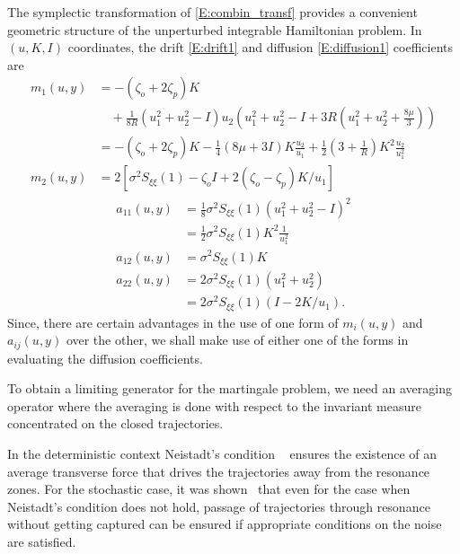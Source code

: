 The symplectic transformation of \eqref{E:combin_transf} provides a convenient geometric structure of the unperturbed integrable Hamiltonian problem. In $(u,K,I)$ coordinates, the drift \eqref{E:drift1} and diffusion \eqref{E:diffusion1} coefficients are
\begin{equation}
\begin{aligned}
m_1(u,y) &= -(\zeta_o + 2\zeta_p) K\\
&\quad + \frac{1}{8 R} \left(u_1^2+u_2^2-I \right) u_2 \left(u_1^2+u_2^2-I + 3 R \left( u_1^2+u_2^2 + \frac{8 \mu}{3} \right) \right) \\
&= -(\zeta_o + 2\zeta_p) K - \frac14 \left(8\mu + 3I\right) K \frac{u_2}{u_1} + \frac12\left(3 + \frac{1}{R}\right)K^2 \frac{u_2}{u_1^2}\\
m_2(u,y) &= 2[\sigma^2 S_{\xi\xi}(1) - \zeta_o I + 2 (\zeta_o - \zeta_p) K/u_1]
\end{aligned}
\label{E:drift2}
\end{equation}
\begin{equation}
\begin{aligned}
a_{11}(u,y) &=\frac{1}{8} \sigma^2 S_{\xi\xi}(1) \left(u_1^2 + u_2^2 - I \right)^2\\
&= \frac12 \sigma^2 S_{\xi\xi}(1) K^2 \frac{1}{u_1^2}\\
a_{12}(u,y) &= \sigma^2 S_{\xi\xi}(1) K\\
a_{22}(u,y) &= 2 \sigma^2S_{\xi\xi}(1) (u_1^2 + u_2^2)\\
&= 2 \sigma^2 S_{\xi\xi}(1) (I - 2 K/u_1).
\end{aligned}
\label{E:diffusion2}
\end{equation}
Since, there are certain advantages in the use of one form of $m_{i}(u,y)$ and $a_{ij}(u,y)$ over the other, we shall make use of either one of the forms in evaluating the diffusion coefficients.

To obtain a limiting generator for the martingale problem, we need an averaging operator where the averaging is done with respect to the invariant measure concentrated on the closed trajectories.

In the deterministic context Neistadt's condition ~\citep{neishtadt75:_passag_throug_reson_in_two_frequen_probl, neishtadt75:_averag_in_multifrequen_system,lochak88:_multip_averag_for_class_system} ensures the existence of an average transverse force that drives the trajectories away from the resonance zones. For the stochastic case, it was shown~\citet{ramakrishnan00:_near_reson_motion_of_random} that even for the case when Neistadt's condition does not hold, passage of trajectories through resonance without getting captured can be ensured if appropriate conditions on the noise are satisfied.


